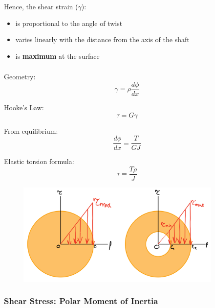 \noindent Hence, the shear strain ($\gamma$):
\begin{itemize}
    \item is proportional to the angle of twist
    \item varies linearly with the distance from the axis of the shaft
    \item is \textbf{maximum} at the surface
\end{itemize}

\subsubsection{}

Geometry: \[\gamma = \rho \frac{d\phi}{dx}\]

\noindent Hooke's Law: \[\tau = G\gamma\]

\noindent From equilibrium: \[\frac{d\phi}{dx} = \frac{T}{GJ}\]

\noindent Elastic torsion formula: \[\tau = \frac{T\rho}{J}\]

\noindent {}

\begin{figure}[!h]
\centering
\includegraphics[angle=0, width=4in]{Torsion-Figures/StressDistribution.png}
\vspace{-2mm}
\caption{\small {}}
\vspace{-3mm}
\label{Fig:StressDist}
\end{figure}

\noindent {}

\subsubsection{Shear Stress: Polar Moment of Inertia}

